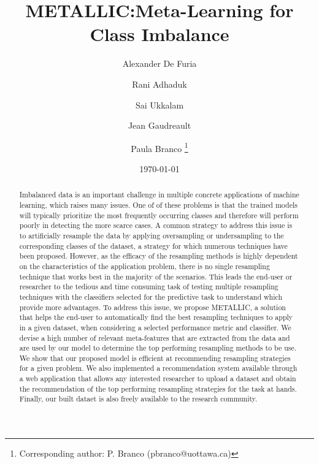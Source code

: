 \documentclass{article}
\author{Alexander De Furia \and Rani Adhaduk \and Sai Ukkalam \and Jean Gaudreault \and Paula Branco \thanks{Corresponding author: P. Branco (pbranco@uottawa.ca)}}
\title{METALLIC:\@ Meta-Learning for Class Imbalance}
\date{\today}
\begin{document}
\maketitle

\begin{abstract}
Imbalanced data is an important challenge in multiple concrete applications of machine learning, which raises many issues. One of of these problems is that the trained models will typically prioritize the most frequently occurring classes and therefore will perform poorly in detecting the more scarce cases. A common strategy to address this issue is to artificially resample the data by applying oversampling or undersampling to the corresponding classes of the dataset, a strategy for which numerous techniques have been proposed. However, as the efficacy of the resampling methods is highly dependent on the characteristics of the application problem, there is no single resampling technique that works best in the majority of the scenarios. This leads the end-user or researcher to the tedious and time consuming task of testing multiple resampling techniques with the classifiers selected for the predictive task to understand which provide more advantages. To address this issue, we propose METALLIC, a solution that helps the end-user to automatically find the best resampling techniques to apply in a given dataset, when considering a selected performance metric and classifier. We devise a high number of relevant meta-features that are extracted from the data and are used by our model to determine the top performing resampling methods to be use. We show that our proposed model is efficient at recommending resampling strategies for a given problem. We also implemented a recommendation system available through a web application that allows any interested researcher to upload a dataset and obtain the recommendation of the top performing resampling strategies for the task at hands. Finally, our built dataet is also freely available to the research community.
\end{abstract}
\end{document}

